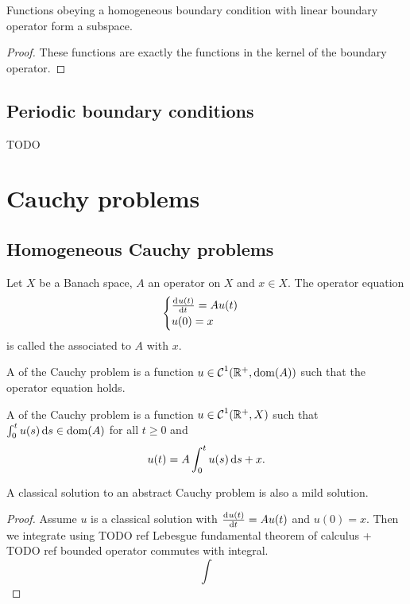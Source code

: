 \begin{lemma}
Functions obeying a homogeneous boundary condition with linear boundary operator form a subspace.
\end{lemma}
\begin{proof}
These functions are exactly the functions in the kernel of the boundary operator.
\end{proof}

\subsection{Periodic boundary conditions}
TODO

\section{Cauchy problems}
\subsection{Homogeneous Cauchy problems}
\begin{definition}
Let $X$ be a Banach space, $A$ an operator on $X$ and $x\in X$. The operator equation
\[ \begin{cases}
\od{u(t)}{t} = Au(t) \\ u(0) = x
\end{cases} \]
is called the  associated to $A$ with  $x$.

A  of the Cauchy problem is a function $u\in \operatorname{\mathcal{C}}^1(\mathbb{R}^+, \operatorname{dom}(A))$ such that the operator equation holds.

A  of the Cauchy problem is a function $u\in \operatorname{\mathcal{C}}^1(\mathbb{R}^+, X)$ such that $\int_0^tu(s)\operatorname{d \!}{s} \in \operatorname{dom}(A)$ for all $t\geq 0$ and
\[ u(t) = A\int_0^tu(s)\operatorname{d \!}{s} + x. \]
\end{definition}

\begin{lemma}
A classical solution to an abstract Cauchy problem is also a mild solution.
\end{lemma}
\begin{proof}
Assume $u$ is a classical solution with $\od{u(t)}{t} = Au(t)$ and $u(0) = x$. Then we integrate using TODO ref Lebesgue fundamental theorem of calculus + TODO ref bounded operator commutes with integral.
\[ \int \]
\end{proof}

